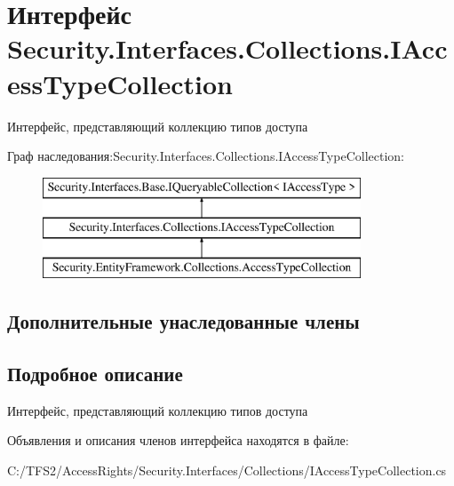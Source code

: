 \hypertarget{interface_security_1_1_interfaces_1_1_collections_1_1_i_access_type_collection}{}\section{Интерфейс Security.\+Interfaces.\+Collections.\+I\+Access\+Type\+Collection}
\label{interface_security_1_1_interfaces_1_1_collections_1_1_i_access_type_collection}


Интерфейс, представляющий коллекцию типов доступа  


Граф наследования\+:Security.\+Interfaces.\+Collections.\+I\+Access\+Type\+Collection\+:\begin{figure}[H]
\begin{center}
\leavevmode
\includegraphics[height=3.000000cm]{d3/d33/interface_security_1_1_interfaces_1_1_collections_1_1_i_access_type_collection}
\end{center}
\end{figure}
\subsection*{Дополнительные унаследованные члены}


\subsection{Подробное описание}
Интерфейс, представляющий коллекцию типов доступа 



Объявления и описания членов интерфейса находятся в файле\+:\begin{DoxyCompactItemize}
\item 
C\+:/\+T\+F\+S2/\+Access\+Rights/\+Security.\+Interfaces/\+Collections/I\+Access\+Type\+Collection.\+cs\end{DoxyCompactItemize}
